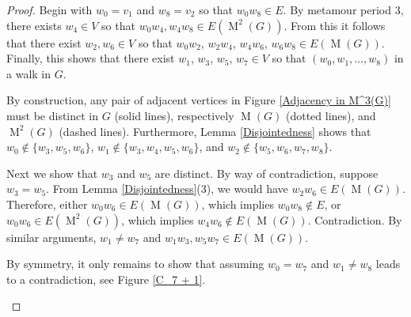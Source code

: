 \documentclass[12pt]{amsart}
\theoremstyle{definition}
\theoremstyle{remark}
\numberwithin{equation}{section}
\numberwithin{figure}{section}
\newcommand{\M}{\operatorname{M}}
\begin{document}
\begin{proof}
    Begin with $w_0=v_1$ and $w_8=v_2$ so that $w_0 w_8 \in E$. 
    By metamour period $3$, there exists $w_4 \in V$ so that $w_0 w_4, w_4 w_8 \in E(\M^2(G))$. 
    From this it follows that there exist $w_2, w_6 \in V$ so that $w_0w_2$, $w_2w_4$, $w_4w_6$, $w_6w_8 \in E(\M(G))$.
    Finally, this shows that there exist $w_1$, $w_3$, $w_5$, $w_7 \in V$ so that $(w_0,w_1,\dots,w_8)$ in a walk in $G$.
    
    By construction, any pair of adjacent vertices in Figure \ref{Adjacency in M^3(G)} must be distinct in $G$ (solid lines), respectively $\M(G)$ (dotted lines), and $\M^2(G)$ (dashed lines). Furthermore, Lemma \ref{Disjointedness} shows that $w_0 \notin \{w_3,w_5,w_6\}$, $w_1 \notin \{w_3,w_4,w_5,w_6\}$, and $w_2 \notin \{w_5,w_6,w_7,w_8\}$.

    Next we show that $w_3$ and $w_5$ are distinct. By way of contradiction, suppose $w_3 = w_5$. From Lemma \ref{Disjointedness}(3), we would have $w_2w_6 \in E(\M(G))$. Therefore, either $w_0w_6 \in E(\M(G))$, which implies $w_0w_8 \notin E$, or $w_0w_6 \in E(\M^2(G))$, which implies $w_4w_6 \notin E(\M(G))$. Contradiction.
    By similar arguments, $w_1 \neq w_7$ and $w_1w_3,w_5w_7 \in E(\M(G))$.

    By symmetry, it only remains to show that assuming $w_0 = w_7$ and $w_1 \neq w_8$ leads to a contradiction, see Figure \ref{C_7 + 1}.
    \begin{figure}[h!]
    \begin{center}
\end{center}
\end{figure}
\end{proof}
\end{document}
